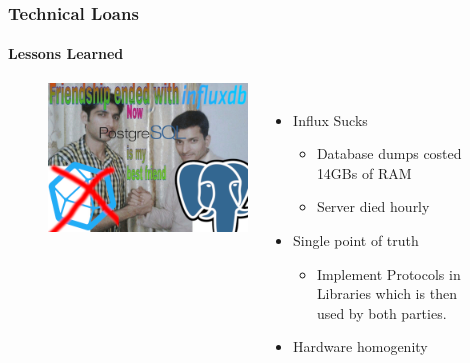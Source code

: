 \begin{frame}
  \frametitle{Technical Loans}
  \framesubtitle{Lessons Learned}

\begin{figure}
\begin{columns}
\begin{center}
\includegraphics[height=0.65\textheight]{figs/meme_postgres_influx.png}
\end{center}
\raggedright
\vspace{0.5cm}

\begin{itemize}
  \item Influx Sucks
        \begin{itemize}
          \item Database dumps costed 14GBs of RAM
          \item Server died hourly
        \end{itemize}
    \item Single point of truth
    \begin{itemize}
        \item Implement Protocols in Libraries which is then used by both parties.
    \end{itemize}
    \item Hardware homogenity
\end{itemize}
\end{columns}
\end{figure}

\end{frame}


